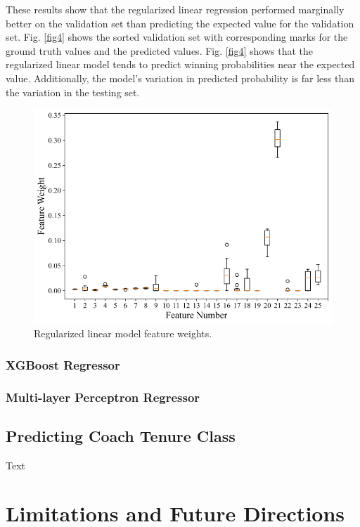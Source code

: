 \documentclass[conference]{IEEEtran}
\begin{document}
These results show that the regularized linear regression performed marginally better on the validation set than predicting the expected value for the validation set. Fig. \ref{fig4} shows the sorted validation set with corresponding marks for the ground truth values and the predicted values. Fig. \ref{fig4} shows that the regularized linear model tends to predict winning probabilities near the expected value. Additionally, the model's variation in predicted probability is far less than the variation in the testing set. 

\begin{figure}[htbp]
\centerline{\includegraphics[width=1\linewidth]{weight1.png}}
\caption{Regularized linear model feature weights.}
\label{fig5}
\end{figure}

\subsubsection{XGBoost Regressor}


\subsubsection{Multi-layer Perceptron Regressor}


\subsection{Predicting Coach Tenure Class}
Text

\section{Limitations and Future Directions}
\end{document}
